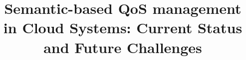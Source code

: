 \documentclass[preprint,12pt]{elsarticle}
\begin{document}
\begin{frontmatter}





\title{Semantic-based QoS management in Cloud Systems: Current Status and Future Challenges}


% 
% 
% 





\author{}

\address{}


\end{frontmatter}
\end{document}
